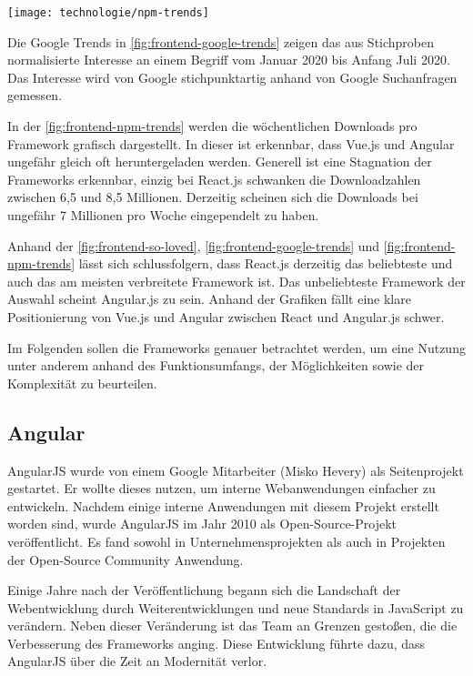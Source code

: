 \begin{center}
	\texttt{[image: technologie/npm-trends]}
	\label{fig:frontend-npm-trends}
\end{center}

Die Google Trends in \autoref{fig:frontend-google-trends} zeigen das aus Stichproben normalisierte Interesse an einem Begriff vom Januar 2020 bis Anfang Juli 2020. Das Interesse wird von Google stichpunktartig anhand von Google Suchanfragen gemessen. \cite{googleHaufigGestellteFragen2020}

In der \autoref{fig:frontend-npm-trends} werden die wöchentlichen Downloads pro Framework grafisch dargestellt. In dieser ist erkennbar, dass Vue.js und Angular ungefähr gleich oft heruntergeladen werden. Generell ist eine Stagnation der Frameworks erkennbar, einzig bei React.js schwanken die Downloadzahlen zwischen 6,5 und 8,5 Millionen. Derzeitig scheinen sich die Downloads bei ungefähr 7 Millionen pro Woche eingependelt zu haben.

Anhand der \autoref{fig:frontend-so-loved}, \autoref{fig:frontend-google-trends} und \autoref{fig:frontend-npm-trends} lässt sich schlussfolgern, dass React.js derzeitig das beliebteste und auch das am meisten verbreitete Framework ist. Das unbeliebteste Framework der Auswahl scheint Angular.js zu sein. Anhand der Grafiken fällt eine klare Positionierung von Vue.js und Angular zwischen React und Angular.js schwer.

Im Folgenden sollen die Frameworks genauer betrachtet werden, um eine Nutzung unter anderem anhand des Funktionsumfangs, der Möglichkeiten sowie der Komplexität zu beurteilen.

\subsection{Angular}
AngularJS wurde von einem Google Mitarbeiter (Misko Hevery) als Seitenprojekt gestartet. Er wollte dieses nutzen, um interne Webanwendungen einfacher zu entwickeln. Nachdem einige interne Anwendungen mit diesem Projekt erstellt worden sind, wurde AngularJS im Jahr 2010 als Open-Source-Projekt veröffentlicht. Es fand sowohl in Unternehmensprojekten als auch in Projekten der Open-Source Community Anwendung. \cite{gaviganHistoryAngular2018}

Einige Jahre nach der Veröffentlichung begann sich die Landschaft der Webentwicklung durch Weiterentwicklungen und neue Standards in JavaScript zu verändern. Neben dieser Veränderung ist das Team an Grenzen gestoßen, die die Verbesserung des Frameworks anging. Diese Entwicklung führte dazu, dass AngularJS über die Zeit an Modernität verlor. \cite{gaviganHistoryAngular2018}

